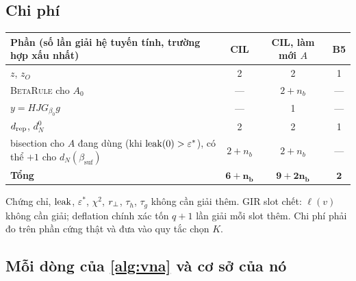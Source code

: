 \subsection{Chi phí}

\begin{tabularx}{\linewidth}{@{}Xccc@{}}
\toprule
Phần (số lần giải hệ tuyến tính, trường hợp xấu nhất) & CIL & CIL, làm mới $A$ & B5 \\
\midrule
$z$, $z_O$ & 2 & 2 & 1 \\
\textsc{BetaRule} cho $A_0$ & --- & $2+n_b$ & --- \\
$y=HJG_{\beta_0}g$ & --- & 1 & --- \\
$d_{\mathrm{rep}}$, $d_N^0$ & 2 & 2 & 1 \\
bisection cho $A$ đang dùng (khi $\operatorname{leak}(0)>\varepsilon^*$), có thể $+1$ cho $d_N(\beta_{\mathrm{suf}})$ & $2+n_b$ & $2+n_b$ & --- \\
\midrule
\textbf{Tổng} & $\mathbf{6+n_b}$ & $\mathbf{9+2n_b}$ & $\mathbf 2$ \\
\bottomrule
\end{tabularx}

\medskip
Chứng chỉ, $\operatorname{leak}$, $\varepsilon^*$, $\chi^2$, $r_{\perp}$, $\tau_h$, $\tau_g$ không cần giải thêm. GIR slot chết: $\ell(v)$ không cần giải; deflation chính xác tốn $q+1$ lần giải mỗi slot thêm. Chi phí phải đo trên phần cứng thật và đưa vào quy tắc chọn $K$.

\subsection{Mỗi dòng của \cref{alg:vna} và cơ sở của nó}

